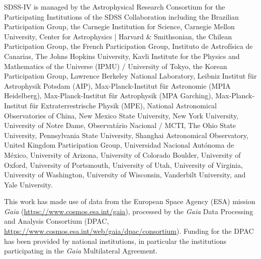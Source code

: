 \documentclass[twocolumn]{AASTeX7/aastex701}
\begin{document}
\begin{acknowledgments}
  SDSS-IV is managed by the Astrophysical Research Consortium for the Participating
  Institutions of the SDSS Collaboration including the Brazilian Participation Group,
  the Carnegie Institution for Science, Carnegie Mellon University, Center for
  Astrophysics | Harvard \& Smithsonian, the Chilean Participation Group, the French
  Participation Group, Instituto de Astrof\'isica de Canarias, The Johns Hopkins
  University, Kavli Institute for the Physics and Mathematics of the Universe (IPMU) /
  University of Tokyo, the Korean Participation Group, Lawrence Berkeley National
  Laboratory, Leibniz Institut f\"ur Astrophysik Potsdam (AIP),  Max-Planck-Institut
  f\"ur Astronomie (MPIA Heidelberg), Max-Planck-Institut f\"ur Astrophysik (MPA
  Garching), Max-Planck-Institut f\"ur Extraterrestrische Physik (MPE), National
  Astronomical Observatories of China, New Mexico State University, New York University,
  University of Notre Dame, Observat\'ario Nacional / MCTI, The Ohio State University,
  Pennsylvania State University, Shanghai Astronomical Observatory, United Kingdom
  Participation Group, Universidad Nacional Aut\'onoma de M\'exico, University of
  Arizona, University of Colorado Boulder, University of Oxford, University of
  Portsmouth, University of Utah, University of Virginia, University of Washington,
  University of Wisconsin, Vanderbilt University, and Yale University.

  This work has made use of data from the European Space Agency (ESA) mission {\it Gaia}
  (\url{https://www.cosmos.esa.int/gaia}), processed by the {\it Gaia} Data Processing
  and Analysis Consortium (DPAC,
  \url{https://www.cosmos.esa.int/web/gaia/dpac/consortium}). Funding for the DPAC has
  been provided by national institutions, in particular the institutions participating
  in the {\it Gaia} Multilateral Agreement.

\end{acknowledgments}

\end{document}
